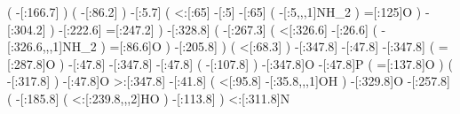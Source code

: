 {                                    (
                            -[:166.7]%
                                    )
                                    (
                             -[:86.2]%
                                    )
                          -[:5.7]%
                                    (
                              <:[:65]%
                                -[:5]%
                               -[:65]%
                                        (
                                -[:5,,,1]NH_2%
                                        )
                              =[:125]O%
                                    )
                        -[:304.2]%
                                )
                    -[:222.6]%
                    =[:247.2]%
                            )
                -[:328.8]%
                            (
                    -[:267.3]%
                                (
                        <[:326.6]%
                         -[:26.6]%
                                    (
                        -[:326.6,,,1]NH_2%
                                    )
                         =[:86.6]O%
                                )
                    -[:205.8]%
                            )
                            (
                     <[:68.3]%
                            )
                -[:347.8]%
                 -[:47.8]%
                -[:347.8]%
                            (
                    =[:287.8]O%
                            )
                 -[:47.8]%
                -[:347.8]%
                 -[:47.8]%
                            (
                    -[:107.8]%
                            )
                -[:347.8]O%
                 -[:47.8]P%
                            (
                    =[:137.8]O%
                            )
                            (
                    -[:317.8]%
                            )
                 -[:47.8]O%
               >:[:347.8]%
                 -[:41.8]%
                            (
                     <[:95.8]%
                 -[:35.8,,,1]OH%
                            )
                -[:329.8]O%
                -[:257.8]%
                            (
                    -[:185.8]%
                                (
                   <:[:239.8,,,2]HO%
                                )
                    -[:113.8]%
                            )
               <:[:311.8]N%
}
